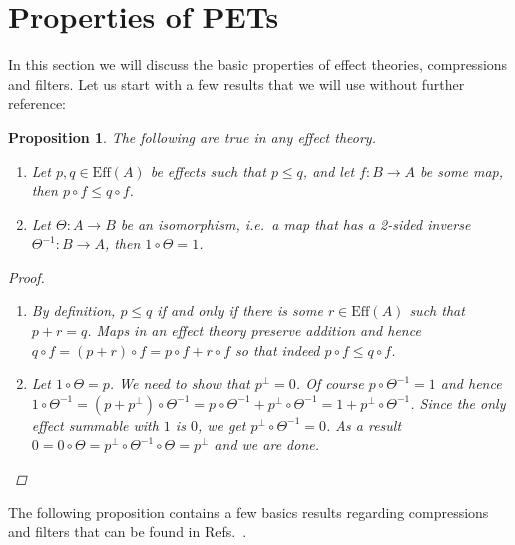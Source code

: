 \documentclass[b5paper,onecolumn,12pt,accepted=2019-05-03, issue=1, volume=1, shorttitle=papers/compositionality-1-1]{compositionalityarticle}
\newcounter{counter}
\numberwithin{counter}{section}
\newtheorem{proposition}[counter]{Proposition}
\newcommand{\pred}{\text{Eff}}
\begin{document}
\section{Properties of PETs}\label{sec:firsttwo}
In this section we will discuss the basic properties of effect theories, compressions and filters. Let us start with a few results that we will use without further reference:
\begin{proposition} The following are true in any effect theory.
    \begin{enumerate}
        \item Let $p,q \in \pred(A)$ be effects such that $p\leq q$, and let $f:B\rightarrow A$ be some map, then $p\circ f \leq q\circ f$.
        \item Let $\Theta: A\rightarrow B$ be an isomorphism, i.e.\ a map that has a 2-sided inverse $\Theta^{-1}:B\rightarrow A$, then $1\circ \Theta = 1$.
    \end{enumerate}
\begin{proof}~
    \begin{enumerate}
    \item By definition, $p\leq q$ if and only if there is some $r\in \pred(A)$ such that $p+r = q$. Maps in an effect theory preserve addition and hence $q\circ f = (p+r)\circ f = p\circ f + r\circ f$ so that indeed $p\circ f \leq q\circ f$.
    \item Let $1\circ \Theta = p$. We need to show that $p^\perp = 0$. Of course $p\circ \Theta^{-1} = 1$ and hence $1\circ \Theta^{-1} = (p+p^\perp)\circ \Theta^{-1} = p\circ \Theta^{-1} + p^\perp \circ \Theta^{-1} = 1 + p^\perp \circ \Theta^{-1}$. Since the only effect summable with $1$ is $0$, we get $p^\perp\circ \Theta^{-1} = 0$. As a result $0 = 0\circ \Theta = p^\perp\circ\Theta^{-1}\circ \Theta = p^\perp$ and we are done. \qedhere
    \end{enumerate}
\end{proof}
    
\end{proposition}

The following proposition contains a few basics results regarding compressions and filters that can be found in Refs.~\cite{cho2015introduction,basthesis}.
\end{document}
